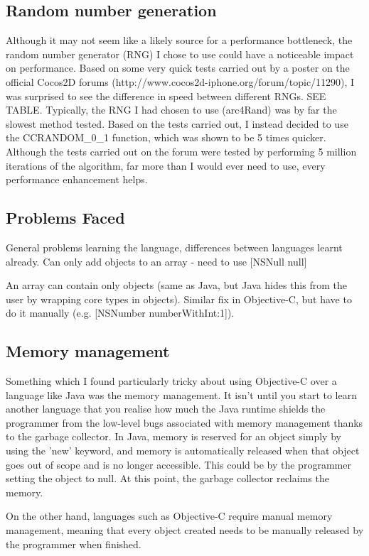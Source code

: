 \documentclass[a4paper,oneside]{report}
\begin{document}
\subsection{Random number generation} Although it may not seem like a likely source for a performance bottleneck, the random number generator (RNG) I chose to use could have a noticeable impact on performance. Based on some very quick tests carried out by a poster on the official Cocos2D forums (http://www.cocos2d-iphone.org/forum/topic/11290), I was surprised to see the difference in speed between different RNGs. SEE TABLE. Typically, the RNG I had chosen to use (arc4Rand) was by far the slowest method tested. Based on the tests carried out, I instead decided to use the CCRANDOM\_0\_1 function, which was shown to be 5 times quicker. Although the tests carried out on the forum were tested by performing 5 million iterations of the algorithm, far more than I would ever need to use, every performance enhancement helps.
		
\subsection{Problems Faced} General problems learning the language, differences between languages learnt already. Can only add objects to an array - need to use [NSNull null]

An array can contain only objects (same as Java, but Java hides this from the user by wrapping core types in objects). Similar fix in Objective-C, but have to do it manually (e.g. [NSNumber numberWithInt:1]).

\subsection{Memory management} Something which I found particularly tricky about using Objective-C over a language like Java was the memory management. It isn't until you start to learn another language that you realise how much the Java runtime shields the programmer from the low-level bugs associated with memory management thanks to the garbage collector. In Java, memory is reserved for an object simply by using the 'new' keyword, and memory is automatically released when that object goes out of scope and is no longer accessible. This could be by the programmer setting the object to null. At this point, the garbage collector reclaims the memory.

On the other hand, languages such as Objective-C  require manual memory management, meaning that every object created needs to be manually released by the programmer when finished. 
\end{document}
